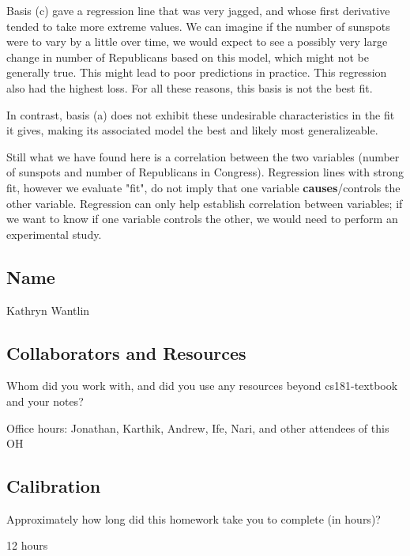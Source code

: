 \documentclass[submit]{harvardml}
\begin{document}
\begin{enumerate}
    Basis (c) gave a regression line that was very jagged, and whose first derivative tended to take more extreme values. We can imagine if the number of sunspots were to vary by a little over time, we would expect to see a possibly very large change in number of Republicans based on this model, which might not be generally true. This might lead to poor predictions in practice. This regression also had the highest loss. For all these reasons, this basis is not the best fit.

    In contrast, basis (a) does not exhibit these undesirable characteristics in the fit it gives, making its associated model the best and likely most generalizeable.

    Still what we have found here is a correlation between the two variables (number of sunspots and number of Republicans in Congress). Regression lines with strong fit, however we evaluate "fit", do not imply that one variable \textbf{causes}/controls the other variable. Regression can only help establish correlation between variables; if we want to know if one variable controls the other, we would need to perform an experimental study.
\end{enumerate}

\newpage
\subsection*{Name}

Kathryn Wantlin

\subsection*{Collaborators and Resources}
Whom did you work with, and did you use any resources beyond cs181-textbook and your notes?

Office hours: Jonathan, Karthik, Andrew, Ife, Nari, and other attendees of this OH

\subsection*{Calibration}
Approximately how long did this homework take you to complete (in hours)?

12 hours
\end{document}
